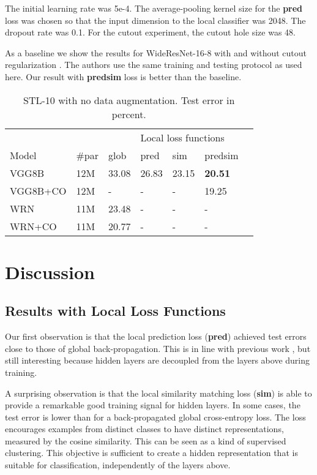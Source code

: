 \documentclass{article}
\begin{document}
The initial learning rate was 5e-4. The average-pooling kernel size for the \textbf{pred} loss was chosen so that the input dimension to the local classifier was 2048. The dropout rate was 0.1. For the cutout experiment, the cutout hole size was 48.

As a baseline we show the results for WideResNet-16-8 with and without cutout regularization \cite{DevriesT17}. The authors use the same training and testing protocol as used here. Our result with \textbf{predsim} loss is better than the baseline.

\begin{table}[h]
  \caption{STL-10 with no data augmentation. Test error in percent.}
  \label{table:stl10}
  \centering
  \begin{tabular}{lllllll}
    \toprule
    &&& \multicolumn{3}{|l}{Local loss functions} \\
    Model   & \#par & glob & \multicolumn{1}{|l}{pred} & sim & \multicolumn{1}{l}{predsim}  \\
    \midrule
    VGG8B & 12M &  33.08 & \multicolumn{1}{|l}{26.83} & 23.15  & \textbf{20.51} \\
    VGG8B+CO & 12M &  - & \multicolumn{1}{|l}{-} & -  & 19.25 \\
    \midrule
    WRN & 11M & 23.48  & \multicolumn{1}{|l}{-} & - & - \\
    WRN+CO & 11M & 20.77  & \multicolumn{1}{|l}{-} & - & - \\
    \bottomrule
  \end{tabular}
\end{table}

\section{Discussion}

\subsection{Results with Local Loss Functions}

Our first observation is that the local prediction loss (\textbf{pred}) achieved test errors close to those of global back-propagation. This is in line with previous work \cite{Mostafa17,BelilovskyEO18}, but still interesting because hidden layers are decoupled from the layers above during training.

A surprising observation is that the local similarity matching loss (\textbf{sim}) is able to provide a remarkable good training signal for hidden layers. In some cases, the test error is lower than for a back-propagated global cross-entropy loss. The loss encourages examples from distinct classes to have distinct representations, measured by the cosine similarity. This can be seen as a kind of supervised clustering. This objective is sufficient to create a hidden representation that is suitable for classification, independently of the layers above.
\end{document}
